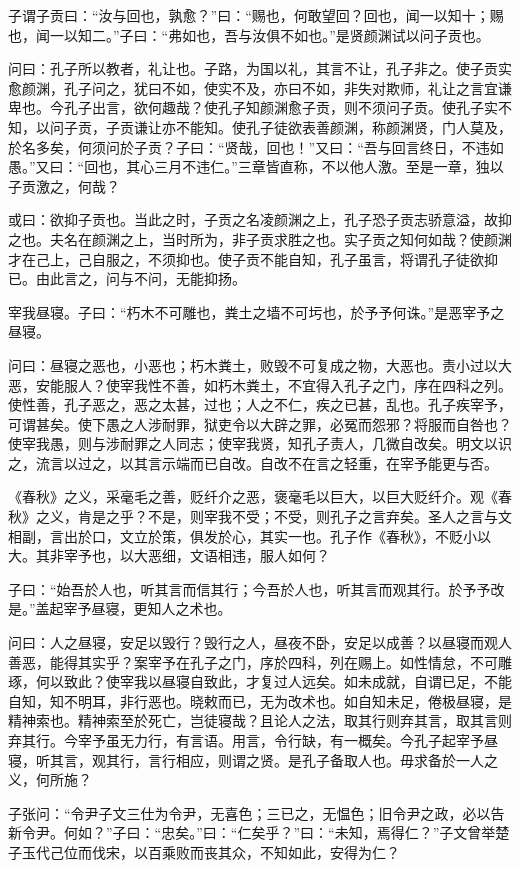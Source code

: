 \documentclass[]{article}
\begin{document}
子谓子贡曰：``汝与回也，孰愈？''曰：``赐也，何敢望回？回也，闻一以知十；赐也，闻一以知二。''子曰：``弗如也，吾与汝俱不如也。''是贤颜渊试以问子贡也。

问曰：孔子所以教者，礼让也。子路，为国以礼，其言不让，孔子非之。使子贡实愈颜渊，孔子问之，犹曰不如，使实不及，亦曰不如，非失对欺师，礼让之言宜谦卑也。今孔子出言，欲何趣哉？使孔子知颜渊愈子贡，则不须问子贡。使孔子实不知，以问子贡，子贡谦让亦不能知。使孔子徒欲表善颜渊，称颜渊贤，门人莫及，於名多矣，何须问於子贡？子曰：``贤哉，回也！''又曰：``吾与回言终日，不违如愚。''又曰：``回也，其心三月不违仁。''三章皆直称，不以他人激。至是一章，独以子贡激之，何哉？

或曰：欲抑子贡也。当此之时，子贡之名凌颜渊之上，孔子恐子贡志骄意溢，故抑之也。夫名在颜渊之上，当时所为，非子贡求胜之也。实子贡之知何如哉？使颜渊才在己上，己自服之，不须抑也。使子贡不能自知，孔子虽言，将谓孔子徒欲抑已。由此言之，问与不问，无能抑扬。

宰我昼寝。子曰：``朽木不可雕也，粪土之墙不可圬也，於予予何诛。''是恶宰予之昼寝。

问曰：昼寝之恶也，小恶也；朽木粪土，败毁不可复成之物，大恶也。责小过以大恶，安能服人？使宰我性不善，如朽木粪土，不宜得入孔子之门，序在四科之列。使性善，孔子恶之，恶之太甚，过也；人之不仁，疾之已甚，乱也。孔子疾宰予，可谓甚矣。使下愚之人涉耐罪，狱吏令以大辟之罪，必冤而怨邪？将服而自咎也？使宰我愚，则与涉耐罪之人同志；使宰我贤，知孔子责人，几微自改矣。明文以识之，流言以过之，以其言示端而已自改。自改不在言之轻重，在宰予能更与否。

《春秋》之义，采毫毛之善，贬纤介之恶，褒毫毛以巨大，以巨大贬纤介。观《春秋》之义，肯是之乎？不是，则宰我不受；不受，则孔子之言弃矣。圣人之言与文相副，言出於口，文立於策，俱发於心，其实一也。孔子作《春秋》，不贬小以大。其非宰予也，以大恶细，文语相违，服人如何？

子曰：``始吾於人也，听其言而信其行；今吾於人也，听其言而观其行。於予予改是。''盖起宰予昼寝，更知人之术也。

问曰：人之昼寝，安足以毁行？毁行之人，昼夜不卧，安足以成善？以昼寝而观人善恶，能得其实乎？案宰予在孔子之门，序於四科，列在赐上。如性情怠，不可雕琢，何以致此？使宰我以昼寝自致此，才复过人远矣。如未成就，自谓已足，不能自知，知不明耳，非行恶也。晓敕而已，无为改术也。如自知未足，倦极昼寝，是精神索也。精神索至於死亡，岂徒寝哉？且论人之法，取其行则弃其言，取其言则弃其行。今宰予虽无力行，有言语。用言，令行缺，有一概矣。今孔子起宰予昼寝，听其言，观其行，言行相应，则谓之贤。是孔子备取人也。毋求备於一人之义，何所施？

子张问：``令尹子文三仕为令尹，无喜色；三已之，无愠色；旧令尹之政，必以告新令尹。何如？''子曰：``忠矣。''曰：``仁矣乎？''曰：``未知，焉得仁？''子文曾举楚子玉代己位而伐宋，以百乘败而丧其众，不知如此，安得为仁？
\end{document}
